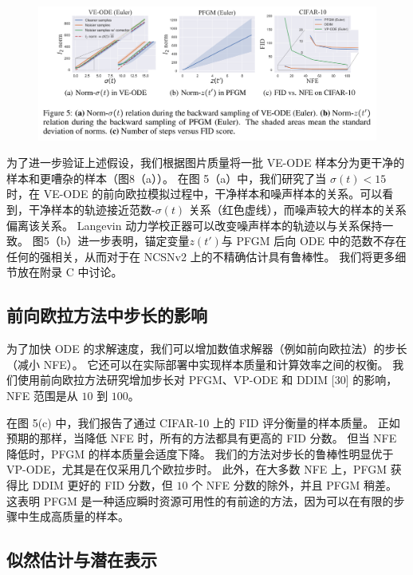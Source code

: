 \documentclass[hyperref,UTF-8]{ctexart}
\newcommand{\0}{\boldsymbol{0}}
\begin{document}
\begin{figure}[ht]
  \centering
  \includegraphics[width=1\textwidth]{img/figure5.png}
\end{figure}

为了进一步验证上述假设，我们根据图片质量将一批 VE-ODE 样本分为更干净的样本和更嘈杂的样本（图8（a））。 在图 5（a）中，我们研究了当 $\sigma(t) < 15 $时，在 VE-ODE 的前向欧拉模拟过程中，干净样本和噪声样本的关系。可以看到，干净样本的轨迹接近范数-$\sigma (t)$ 关系（红色虚线），而噪声较大的样本的关系偏离该关系。 Langevin 动力学校正器可以改变噪声样本的轨迹以与关系保持一致。 图5（b）进一步表明，锚定变量$z(t')$与 PFGM 后向 ODE 中的范数不存在任何的强相关，从而对于在 NCSNv2 上的不精确估计具有鲁棒性。 我们将更多细节放在附录 C 中讨论。

\subsection{前向欧拉方法中步长的影响}

为了加快 ODE 的求解速度，我们可以增加数值求解器（例如前向欧拉法）的步长（减小 NFE）。 它还可以在实际部署中实现样本质量和计算效率之间的权衡。 我们使用前向欧拉方法研究增加步长对 PFGM、VP-ODE 和 DDIM [30] 的影响，NFE 范围是从 $10$ 到 $100$。

在图 5(c) 中，我们报告了通过 CIFAR-10 上的 FID 评分衡量的样本质量。 正如预期的那样，当降低 NFE 时，所有的方法都具有更高的 FID 分数。 但当 NFE 降低时，PFGM 的样本质量会适度下降。 我们的方法对步长的鲁棒性明显优于 VP-ODE，尤其是在仅采用几个欧拉步时。 此外，在大多数 NFE 上，PFGM 获得比 DDIM 更好的 FID 分数，但 $10$ 个 NFE 分数的除外，并且 PFGM 稍差。 这表明 PFGM 是一种适应瞬时资源可用性的有前途的方法，因为可以在有限的步骤中生成高质量的样本。

\subsection{似然估计与潜在表示}
\end{document}
